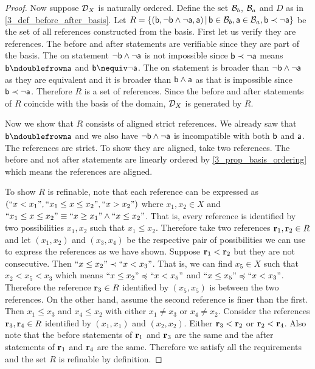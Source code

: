 \documentclass[11pt,letterpaper,fleqn]{memoir} %
\begin{document}
\begin{mathSection}
\begin{proof}
	Now suppose $\edomain_X$ is naturally ordered. Define the set $\basis_b$, $\basis_a$ and $D$ as in \ref{3_def_before_after_basis}. Let $R = \{ (\stmt[b], \NOT \stmt[b] \AND \NOT \stmt[a], \stmt[a]) \, | \, \stmt[b] \in \basis_b, \stmt[a] \in \basis_a, \stmt[b] \snarrower \NOT \stmt[a] \}$ be the set of all references constructed from the basis. First let us verify they are references. The before and after statements are verifiable since they are part of the basis. The on statement $\NOT \stmt[b] \AND \NOT \stmt[a]$ is not impossible since $\stmt[b] \snarrower \NOT \stmt[a]$ means $\stmt[b] \ncomp \stmt[a]$ and $\stmt[b] \nequiv \NOT \stmt[a]$. The on statement is broader than $\NOT \stmt[b] \AND \NOT \stmt[a]$ as they are equivalent and it is broader than $\stmt[b] \AND \stmt[a]$ as that is impossible since $\stmt[b] \snarrower \NOT \stmt[a]$. Therefore $R$ is a set of references. Since the before and after statements of $R$ coincide with the basis of the domain, $\edomain_X$ is generated by $R$.
	
	Now we show that $R$ consists of aligned strict references. We already saw that $\stmt[b] \ncomp \stmt[a]$ and we also have $\NOT \stmt[b] \AND \NOT \stmt[a]$ is incompatible with both $\stmt[b]$ and $\stmt[a]$. The references are strict. To show they are aligned, take two references. The before and not after statements are linearly ordered by \ref{3_prop_basis_ordering} which means the references are aligned.
	
	To show $R$ is refinable, note that each reference can be expressed as $(``x < x_1", ``x_1 \leq x \leq x_2", ``x > x_2")$ where $x_1, x_2 \in X$ and $``x_1 \leq x \leq x_2" \equiv ``x \geq x_1" \AND ``x \leq x_2"$. That is, every reference is identified by two possibilities $x_1, x_2$ such that $x_1 \leq x_2$. Therefore take two references $\refStmt_1, \refStmt_2 \in R$ and let $(x_1, x_2)$ and $(x_3, x_4)$ be the respective pair of possibilities we can use to express the references as we have shown. Suppose $\refStmt_1 < \refStmt_2$ but they are not consecutive. Then $``x \leq x_2" \snarrower ``x < x_3"$. That is, we can find $x_5 \in X$ such that  $x_2 < x_5 < x_3$ which means $``x \leq x_2" \narrower ``x < x_5"$ and $``x \leq x_5" \narrower ``x < x_3"$. Therefore the reference $\refStmt_3 \in R$ identified by $(x_5, x_5)$ is between the two references. On the other hand, assume the second reference is finer than the first. Then $x_1 \leq x_3$ and $x_4 \leq x_2$ with either $x_1 \neq x_3$ or $x_4 \neq x_2$. Consider the references $\refStmt_3, \refStmt_4 \in R$ identified by $(x_1, x_1)$ and $(x_2, x_2)$. Either $\refStmt_3 < \refStmt_2$ or $\refStmt_2 < \refStmt_4$. Also note that the before statements of $\refStmt_1$ and $\refStmt_3$ are the same and the after statements of $\refStmt_1$ and $\refStmt_4$ are the same. Therefore we satisfy all the requirements and the set $R$ is refinable by definition.
\end{proof}
\end{mathSection}
\end{document}
